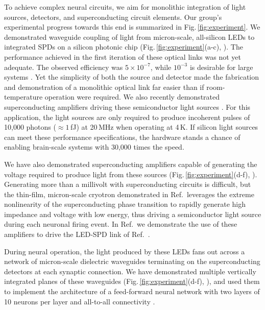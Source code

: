\documentclass[twocolumn]{article}
\newcommand{\onlinecite}[1]{\hspace{-1 ex} \nocite{#1}\citenum{#1}}
\begin{document}
{To achieve complex neural circuits, we aim for monolithic integration of light sources, detectors, and superconducting circuit elements. Our group's experimental progress towards this end is summarized in Fig.\,\ref{fig:experiment}. We demonstrated waveguide coupling of light from micron-scale, all-silicon LEDs to integrated SPDs on a silicon photonic chip (Fig.\,\ref{fig:experiment}(a-c), \cite{buch2017}). The performance achieved in the first iteration of these optical links was not yet adequate. The observed efficiency was $5\times10^{-7}$, while $10^{-3}$ is desirable for large systems \cite{sh2018}. Yet the simplicity of both the source and detector made the fabrication and demonstration of a monolithic optical link far easier than if room-temperature operation were required. We also recently demonstrated superconducting amplifiers driving these semiconductor light sources \cite{mcve2019}. For this application, the light sources are only required to produce incoherent pulses of 10,000 photons ($\approx 1$\,fJ) at 20\,MHz when operating at 4\,K. If silicon light sources can meet these performance specifications, the hardware stands a chance of enabling brain-scale systems with 30,000 times the speed.

We have also demonstrated superconducting amplifiers capable of generating the voltage required to produce light from these sources (Fig.\,\ref{fig:experiment}(d-f), \cite{mcve2019}). Generating more than a millivolt with superconducting circuits is difficult, but the thin-film, micron-scale cryotron demonstrated in Ref.\,\cite{mcve2019} leverages the extreme nonlinearity of the superconducting phase transition to rapidly generate high impedance and voltage with low energy, thus driving a semiconductor light source during each neuronal firing event. In Ref.\,\onlinecite{mcve2019} we demonstrate the use of these amplifiers to drive the LED-SPD link of Ref.\,\onlinecite{buch2017}.

During neural operation, the light produced by these LEDs fans out across a network of micron-scale dielectric waveguides terminating on the superconducting detectors at each synaptic connection. We have demonstrated multiple vertically integrated planes of these waveguides (Fig.\,\ref{fig:experiment}(d-f), \cite{chbu2017}), and used them to implement the architecture of a feed-forward neural network with two layers of 10 neurons per layer and all-to-all connectivity \cite{chbu2018}.

}
\end{document}
